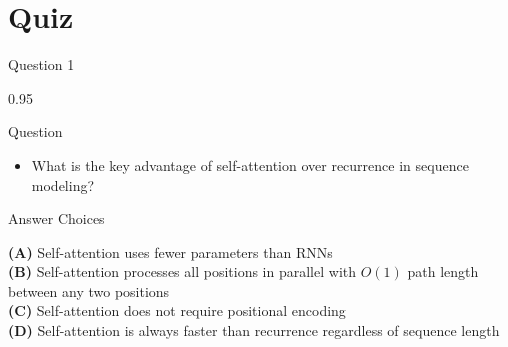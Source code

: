 \documentclass[9pt, aspectratio=169, t]{beamer}
\begin{document}
\section{Quiz}

\begin{frame}{Question 1}
    \begin{cminipage}{0.95\textwidth}
    \begin{alertblock}{Question}
        \begin{itemize}\setlength{\itemsep}{0pt}
            \item What is the key advantage of self-attention over recurrence in sequence modeling?
        \end{itemize}
    \end{alertblock}

    \vspace{0.3cm}

    \begin{block}{Answer Choices}

        \textcolor{MainBlue}{\textbf{(A)}} Self-attention uses fewer parameters than RNNs\\[3pt]

        \textcolor{MainBlue}{\textbf{(B)}} Self-attention processes all positions in parallel with $O(1)$ path length between any two positions\\[3pt]

        \textcolor{MainBlue}{\textbf{(C)}} Self-attention does not require positional encoding\\[3pt]

        \textcolor{MainBlue}{\textbf{(D)}} Self-attention is always faster than recurrence regardless of sequence length

    \end{block}
    \end{cminipage}
\end{frame}
\end{document}
